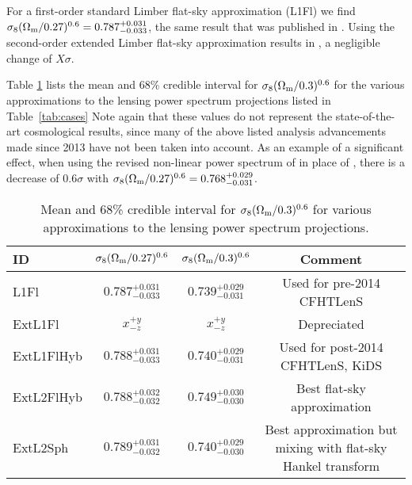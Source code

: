 For a first-order standard Limber flat-sky approximation (L1Fl) we find
$\sigma_8 (\Omega_{\rm m}/0.27)^{0.6} =0.787^{+0.031}_{-0.033}$, the same
result that was published in \cite{CFHTLenS-2pt-notomo}. Using the second-order
extended Limber flat-sky approximation results in , a negligible change of $X\sigma$. 

Table \ref{tab:CFHTLenS_Sigma8} lists the mean and 68\% credible interval for
$\sigma_8 (\Omega_{\rm m}/0.3)^{0.6}$ for the various approximations to the
lensing power spectrum projections listed in Table~\ref{tab:cases} Note again
that these values do not represent the state-of-the-art cosmological results,
since many of the above listed analysis advancements made since 2013 have not
been taken into account. As an example of a significant effect, when using the
revised non-linear power spectrum of \cite{2012ApJ...761..152T} in place of
\cite{2003MNRAS.341.1311S}, there is a decrease of $0.6 \sigma$ with $\sigma_8
(\Omega_{\rm m}/0.27)^{0.6} =0.768^{+0.029}_{-0.031}$.


\renewcommand{\baselinestretch}{1.5}
\begin{table}
\begin{centering}
  \label{tab:CFHTLenS_Sigma8}

  \caption{Mean and 68\% credible interval for 
  $\sigma_8 (\Omega_{\rm m}/0.3)^{0.6}$ for various approximations to the lensing
  power spectrum projections.}

  \begin{tabular}{lccc} \hline
  ID         & $\sigma_8 (\Omega_{\rm m}/0.27)^{0.6}$ & $\sigma_8 (\Omega_{\rm m}/0.3)^{0.6}$ & Comment \\ \hline
  L1Fl       & $0.787^{+0.031}_{-0.033}$ & $0.739^{+0.029}_{-0.031}$ & Used for pre-2014 CFHTLenS \\
  ExtL1Fl    & $x^{+y}_{-z}$ & $x^{+y}_{-z}$ & Depreciated \\
  ExtL1FlHyb & $0.788^{+0.031}_{-0.033}$ & $0.740^{+0.029}_{-0.031}$ & Used for post-2014 CFHTLenS, KiDS \\
  ExtL2FlHyb & $0.788^{+0.032}_{-0.032}$ & $0.749^{+0.030}_{-0.030}$ & Best flat-sky approximation \\
  ExtL2Sph   & $0.789^{+0.031}_{-0.032}$ & $0.740^{+0.029}_{-0.030}$ & Best approximation but mixing with flat-sky Hankel transform \\ \hline
  \end{tabular}

\end{centering}
\end{table}
\renewcommand{\baselinestretch}{1}



